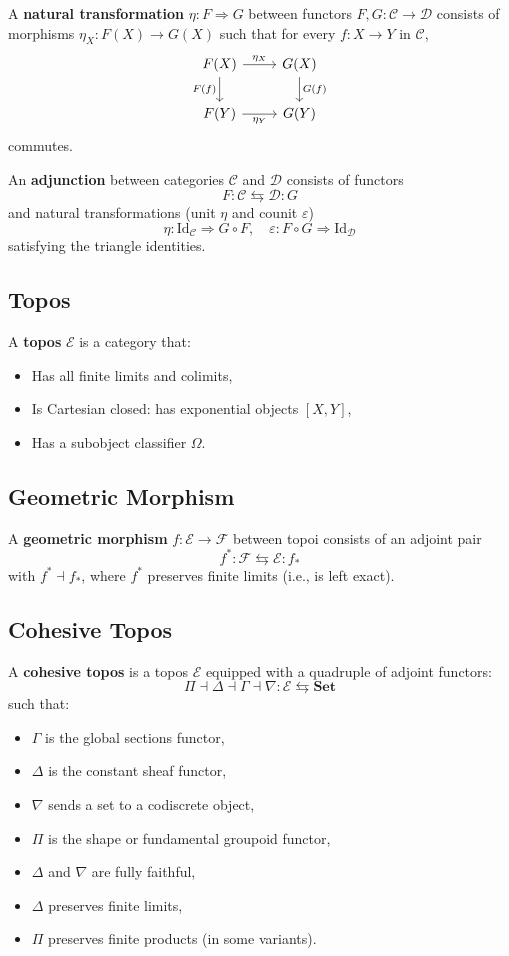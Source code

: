 \documentclass{article}
\begin{document}
A \textbf{natural transformation} $\eta: F \Rightarrow G$ between functors $F, G: \mathcal{C} \to \mathcal{D}$ consists of morphisms $\eta_X: F(X) \to G(X)$ such that for every $f: X \to Y$ in $\mathcal{C}$,
\[
\begin{tikzcd}
F(X) \arrow[r, "\eta_X"] \arrow[d, "F(f)"'] & G(X) \arrow[d, "G(f)"] \\
F(Y) \arrow[r, "\eta_Y"'] & G(Y)
\end{tikzcd}
\]
commutes.

An \textbf{adjunction} between categories $\mathcal{C}$ and $\mathcal{D}$ consists of functors
\[
F: \mathcal{C} \leftrightarrows \mathcal{D} : G
\]
and natural transformations (unit $\eta$ and counit $\varepsilon$)
\[
\eta: \mathrm{Id}_{\mathcal{C}} \Rightarrow G \circ F, \quad \varepsilon: F \circ G \Rightarrow \mathrm{Id}_{\mathcal{D}}
\]
satisfying the triangle identities.

\subsection{Topos}
A \textbf{topos} $\mathcal{E}$ is a category that:
\begin{itemize}
  \item Has all finite limits and colimits,
  \item Is Cartesian closed: has exponential objects $[X,Y]$,
  \item Has a subobject classifier $\Omega$.
\end{itemize}

\subsection{Geometric Morphism}
A \textbf{geometric morphism} $f: \mathcal{E} \to \mathcal{F}$ between topoi consists of an adjoint pair
\[
f^*: \mathcal{F} \leftrightarrows \mathcal{E} : f_*
\]
with $f^* \dashv f_*$, where $f^*$ preserves finite limits (i.e., is left exact).

\newpage
\subsection{Cohesive Topos}
A \textbf{cohesive topos} is a topos $\mathcal{E}$ equipped with a quadruple of adjoint functors:
\[
\Pi \dashv \Delta \dashv \Gamma \dashv \nabla : \mathcal{E} \leftrightarrows \mathbf{Set}
\]
such that:
\begin{itemize}
  \item $\Gamma$ is the global sections functor,
  \item $\Delta$ is the constant sheaf functor,
  \item $\nabla$ sends a set to a codiscrete object,
  \item $\Pi$ is the shape or fundamental groupoid functor,
  \item $\Delta$ and $\nabla$ are fully faithful,
  \item $\Delta$ preserves finite limits,
  \item $\Pi$ preserves finite products (in some variants).
\end{itemize}
\end{document}
